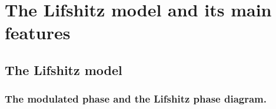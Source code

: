 


\section{The Lifshitz model and its main features}

\subsection{The Lifshitz model}

\subsubsection{The modulated phase and the Lifshitz phase diagram.}

